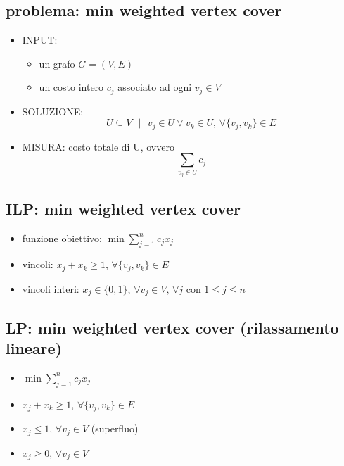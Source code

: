 
\subsection*{problema: min weighted vertex cover}
\begin{flushleft}
	\begin{itemize}
		\item INPUT:
		\begin{itemize}
			\item un grafo $G=(V,E)$
			\item un costo intero $c_j$ associato ad ogni $v_j\in V$
		\end{itemize}
		\item SOLUZIONE:
			$$U\subseteq V\text{ }\vert\text{ }v_j\in U\vee v_k\in U\text{, }\forall\{v_j,v_k\}\in E$$
		\item MISURA: costo totale di U, ovvero
			$$\sum_{v_j\in U}c_j$$
	\end{itemize}
\end{flushleft}


\subsection*{ILP: min weighted vertex cover}
\begin{flushleft}
	\begin{itemize}
		\item funzione obiettivo: $\min\sum_{j=1}^n c_jx_j$
		\item vincoli: $x_j+x_k\geq 1\text{, }\forall\{v_j,v_k\}\in E$
		\item vincoli interi: $x_j\in\{0,1\}\text{, }\forall v_j\in V\text{, }\forall j\text{ con }1\leq j\leq n$
	\end{itemize}
\end{flushleft}


\subsection*{LP: min weighted vertex cover (rilassamento lineare)}
\begin{flushleft}
	\begin{itemize}
		\item $\min\sum_{j=1}^n c_jx_j$
		\item $x_j+x_k\geq 1\text{, }\forall\{v_j,v_k\}\in E$
		\item \sout{$x_j\leq 1\text{, }\forall v_j\in V$} (superfluo)
		\item $x_j\geq 0\text{, }\forall v_j\in V$
	\end{itemize}
\end{flushleft}

